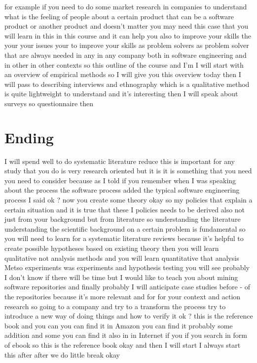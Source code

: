 \documentclass[conference, compsoc, twoside]{IEEEtran}
\begin{document}
for example if you need to do some market research in companies to understand what is the feeling of people about a certain product that can be a software product or another product and doesn't matter you may need this case that you will learn in this in this course and it can help you also to improve your skills the your your issues your to improve your skills as problem solvers as problem solver that are always needed in any in any company both in software engineering and in other in other contexts so this outline of the course and I'm I will start with an overview of empirical methods 
so I will give you this overview today then I will pass to describing interviews and ethnography which is a qualitative method is quite lightweight to understand and it's interesting then I will speak about surveys so questionnaire then 
\section{Ending}
I will spend well to do systematic literature reduce this is important for any study that you do is very research oriented but it is it is something that you need you need to consider because as I told if you remember when I was speaking about the process the software process added the typical software engineering process I said ok ? now you create some theory okay so my policies that explain a certain situation and it is true that these I policies needs to be derived also not just from your background but from literature so understanding the literature understanding the scientific background on a certain problem is fundamental so you will need to learn for a systematic literature reviews because it's helpful to create possible hypotheses based on existing theory then you will learn qualitative not analysis methods and you will learn quantitative that analysis Metso experiments was experiments and hypothesis testing you will see probably I don't know if there will be time but I would like to teach you about mining software repositories and finally probably I will anticipate case studies before - of the repositories because it's more relevant and for for your context and action research so going to a company and try to a transform the process try to introduce a new way of doing things and how to verify it ok ? this is the reference book and you can you can find it in Amazon you can find it probably some addition and some you can find it also in in Internet if you if you search in form of ebook so this is the reference book okay and then I will start I always start this after after we do little break okay 


\end{document}
